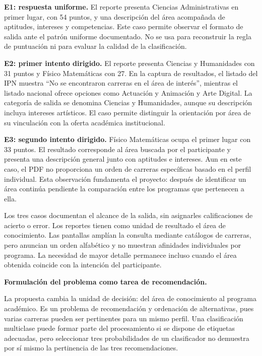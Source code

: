 \textbf{E1: respuesta uniforme.} El reporte presenta Ciencias Administrativas en primer lugar, con 54 puntos, y una descripción del área acompañada de aptitudes, intereses y competencias. Este caso permite observar el formato de salida ante el patrón uniforme documentado. No se usa para reconstruir la regla de puntuación ni para evaluar la calidad de la clasificación.

\textbf{E2: primer intento dirigido.} El reporte presenta Ciencias y Humanidades con 31 puntos y Físico Matemáticas con 27. En la captura de resultados, el listado del IPN muestra ``No se encontraron carreras en el área de interés'', mientras el listado nacional ofrece opciones como Actuación y Animación y Arte Digital. La categoría de salida se denomina Ciencias y Humanidades, aunque su descripción incluya intereses artísticos. El caso permite distinguir la orientación por área de su vinculación con la oferta académica institucional.

\textbf{E3: segundo intento dirigido.} Físico Matemáticas ocupa el primer lugar con 33 puntos. El resultado corresponde al área buscada por el participante y presenta una descripción general junto con aptitudes e intereses. Aun en este caso, el PDF no proporciona un orden de carreras específicas basado en el perfil individual. Esta observación fundamenta el proyecto: después de identificar un área continúa pendiente la comparación entre los programas que pertenecen a ella.

Los tres casos documentan el alcance de la salida, sin asignarles calificaciones de acierto o error. Los reportes tienen como unidad de resultado el área de conocimiento. Las pantallas amplían la consulta mediante catálogos de carreras, pero anuncian un orden alfabético y no muestran afinidades individuales por programa. La necesidad de mayor detalle permanece incluso cuando el área obtenida coincide con la intención del participante.

\noindent\textbf{Formulación del problema como tarea de recomendación.}\par\smallskip

La propuesta cambia la unidad de decisión: del área de conocimiento al programa académico. Es un problema de recomendación y ordenación de alternativas, pues varias carreras pueden ser pertinentes para un mismo perfil. Una clasificación multiclase puede formar parte del procesamiento si se dispone de etiquetas adecuadas, pero seleccionar tres probabilidades de un clasificador no demuestra por sí mismo la pertinencia de las tres recomendaciones.

